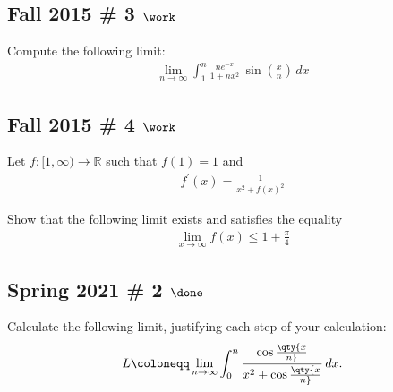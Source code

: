 \hypertarget{fall-2015-3-work}{%
\subsection{\texorpdfstring{Fall 2015 \# 3
\(\work\)}{Fall 2015 \# 3 \textbackslash work}}\label{fall-2015-3-work}}

Compute the following limit:
\begin{align*}
\lim _{n \rightarrow \infty} \int_{1}^{n} \frac{n e^{-x}}{1+n x^{2}} \, \sin \left(\frac x n\right) \, dx
\end{align*}

\hypertarget{fall-2015-4-work}{%
\subsection{\texorpdfstring{Fall 2015 \# 4
\(\work\)}{Fall 2015 \# 4 \textbackslash work}}\label{fall-2015-4-work}}

Let \(f: [1, \infty) \to {\mathbb{R}}\) such that \(f(1) = 1\) and
\begin{align*}
f^{\prime}(x)= \frac{1} {x^{2}+f(x)^{2}}
\end{align*}

Show that the following limit exists and satisfies the equality
\begin{align*}
\lim _{x \rightarrow \infty} f(x) \leq 1 + \frac \pi 4
\end{align*}

\hypertarget{spring-2021-2-done}{%
\subsection{\texorpdfstring{Spring 2021 \# 2
\(\done\)}{Spring 2021 \# 2 \textbackslash done}}\label{spring-2021-2-done}}

\begin{problem}[?]

Calculate the following limit, justifying each step of your calculation:
\begin{align*}
L \coloneqq\lim_{n\to \infty} \int_0^n { \cos\qty{x\over n} \over x^2 + \cos\qty{x\over n} }\,dx
.\end{align*}

\end{problem}

